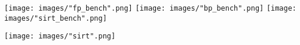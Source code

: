 \documentclass{beamer}
\begin{document}
\begin{frame}
\centering
\texttt{[image: images/"fp\_bench".png]}
\texttt{[image: images/"bp\_bench".png]}
\texttt{[image: images/"sirt\_bench".png]}
\end{frame}

\begin{frame}
\centering
\texttt{[image: images/"sirt".png]}
\end{frame}

 \begin{frame}
 \nocite{*}
 
 
 \end{frame}
\end{document}
